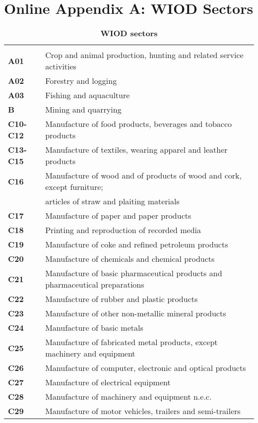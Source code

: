 \documentclass[12pt,a4paper]{article}
\begin{document}
\section*{Online Appendix A: WIOD Sectors}
\begin{table}[H]
 \centering
 \caption{\footnotesize{\textbf{WIOD sectors}}}
 \footnotesize
 \begin{tabular}{ll}
  \hline \\
\textbf{A01} &{Crop and animal production, hunting and related service activities}\\
\textbf{A02} &{Forestry and logging}\\
\textbf{A03} &{Fishing and aquaculture}\\
\textbf{B} &{Mining and quarrying}\\
\textbf{C10-C12} &{Manufacture of food products, beverages and tobacco products}\\
\textbf{C13-C15} &{Manufacture of textiles, wearing apparel and leather products}\\
\textbf{C16} &{Manufacture of wood and of products of wood and cork, except furniture;} \\
 & {articles of straw and plaiting materials}\\
\textbf{C17} &{Manufacture of paper and paper products}\\
\textbf{C18} &{Printing and reproduction of recorded media}\\
\textbf{C19} &{Manufacture of coke and refined petroleum products}\\
\textbf{C20} &{Manufacture of chemicals and chemical products}\\
\textbf{C21} &{Manufacture of basic pharmaceutical products and pharmaceutical preparations}\\
\textbf{C22} &{Manufacture of rubber and plastic products}\\
\textbf{C23} &{Manufacture of other non-metallic mineral products}\\
\textbf{C24} &{Manufacture of basic metals}\\
\textbf{C25} &{Manufacture of fabricated metal products, except machinery and equipment}\\
\textbf{C26} &{Manufacture of computer, electronic and optical products}\\
\textbf{C27} &{Manufacture of electrical equipment}\\
\textbf{C28} &{Manufacture of machinery and equipment n.e.c.}\\
\textbf{C29} &{Manufacture of motor vehicles, trailers and semi-trailers}\\

\end{tabular}
\end{table}
\end{document}
